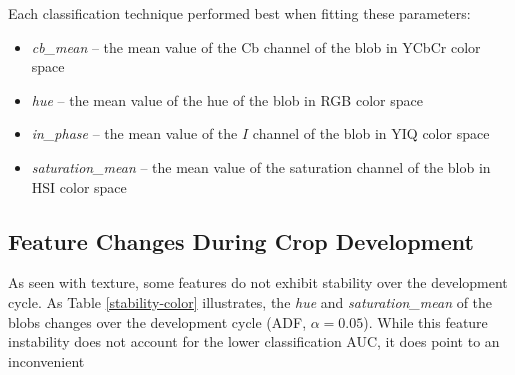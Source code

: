 \documentclass[letterpaper]{report}
\begin{document}
Each classification technique performed best when fitting these parameters:
\begin{itemize}
	\item{\textit{cb\_mean} -- the mean value of the Cb channel of the blob in YCbCr color space}
	\item{\textit{hue} -- the mean value of the hue of the blob in RGB color space}
	\item{\textit{in\_phase} -- the mean value of the $I$ channel of the blob in YIQ color space}
	\item{\textit{saturation\_mean} -- the mean value of the saturation channel of the blob in HSI color space}
\end{itemize}

\subsection{Feature Changes During Crop Development}
As seen with texture, some features do not exhibit stability over the development cycle. As Table \ref{stability-color} illustrates, the \textit{hue} and \textit{saturation\_mean} of the blobs changes over the development cycle (ADF, $\alpha = 0.05$). While this feature instability does not account for the lower classification AUC, it does point to an inconvenient

{
\renewcommand{\arraystretch}{1.2}

}
\end{document}
